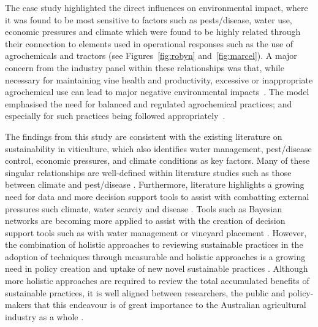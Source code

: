 The case study highlighted the direct influences on environmental impact, where it was found to be most sensitive to factors such as pests/disease, water use, economic pressures and climate which were found to be highly related through their connection to elements used in operational responses such as the use of agrochemicals and tractors (see Figures~\ref{fig:robyn} and~\ref{fig:marcel}). A major concern from the industry panel within these relationships was that, while necessary for maintaining vine health and productivity, excessive or inappropriate agrochemical use can lead to major negative environmental impacts~\cite{alonsogonzalezUnveilingTerroirEvaluating2024,manjarres-lopezAssessmentPesticideResidues2021}. The model emphasised the need for balanced and regulated agrochemical practices; and especially for such practices being followed appropriately~\cite{baianoOverviewSustainabilityWine2021}.


The findings from this study are consistent with the existing literature on sustainability in viticulture, which also identifies water management, pest/disease control, economic pressures, and climate conditions as key factors. Many of these singular relationships are well-defined within literature studies such as those between climate and pest/disease \cite{olatinwoChapterWeatherbasedPest2014}. Furthermore, literature  highlights a growing need for data and more decision support tools to assist with combatting external pressures such climate, water scarciy and disease \cite{naigeonDATADecisionmakingViticulture2023,stefaniniBayesianCausalModel2022,fincoCombiningPrecisionViticulture2022a,laurentLocalInfluenceClimate2022}. Tools such as Bayesian networks are becoming more applied to assist with the creation of decision support tools such as with water management \cite{carmonaUseParticipatoryObjectOriented2011} or vineyard placement \cite{abbalDecisionSupportSystem2016}. However, the combination of holistic approaches to reviewing sustainable practices in the adoption of techniques through measurable and holistic approaches is a growing need in policy creation and uptake of new novel sustainable practices \autocite{mayfieldDesigningExpertledBayesian2023,baianoOverviewSustainabilityWine2021,dichiaraCollaborativeApproachAchieving2024}. Although more holistic approaches are required to review the total accumulated benefits of sustainable practices, it is well aligned between researchers, the public and policy-makers that this endeavour is of great importance to the Australian agricultural industry as a whole \cite{dumbrellComparingAustralianPublic2024}.

